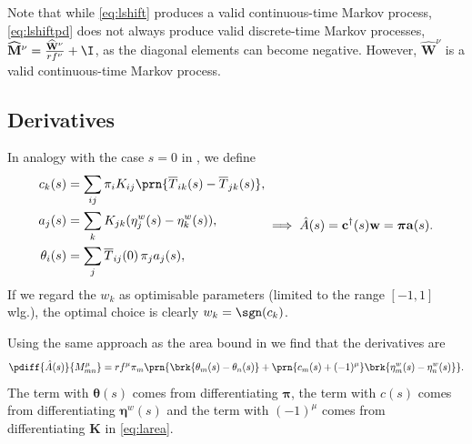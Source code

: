 \documentclass[12pt]{article}
\newcommand{\eqm}{\pi}
\newcommand{\eq}{\boldsymbol{\eqm}}
\newcommand{\fptm}{T}
\newcommand{\fptbm}{\overline{\fptm}}
\newcommand{\etwm}{\eta^w}
\newcommand{\etw}{\boldsymbol{\eta}^w}
\newcommand{\thbm}{\theta}
\newcommand{\thb}{\boldsymbol{\thbm}}
\newcommand{\wm}{w}
\newcommand{\w}{\mathbf{\wm}}
\newcommand{\Wm}{W}
\newcommand{\W}{\mathbf{\Wm}}
\newcommand{\MMdm}{M}
\newcommand{\MMd}{\mathbf{\MMdm}}
\newcommand{\encm}{K}
\newcommand{\enc}{\mathbf{\encm}}
\newcommand{\shift}[1]{\widehat{#1}}
\begin{document}
Note that while \cref{eq:lshift} produces a valid continuous-time Markov process, \cref{eq:lshiftpd} does not always produce valid discrete-time Markov processes, \( \shift{\MMd}^\nu = \frac{\shift{\W}^\nu}{rf^\nu} + \I \), as the diagonal elements can become negative.
However, \(\shift{\W}^\nu \) is a valid continuous-time Markov process.


\subsection{Derivatives}\label{sec:lderiv}

In analogy with the case \(s=0\) in \cite{Lahiri2013synapse}, we define
%
\begin{equation}\label{eq:lareacoeffs}
  \begin{aligned}
    {c}_k(s) &= \sum_{ij} \eqm_i \encm_{ij} \prn{\fptbm_{ik}(s)-\fptbm_{jk}(s)}, \\
    {a}_j(s) &= \sum_{k} \encm_{jk} (\etwm_{j}(s) - \etwm_{k}(s)), \\
    \thbm_i(s) &= \sum_j \fptbm_{ij}(0)\, \eqm_j {a}_j(s), \\
  \end{aligned}
    \implies
    \hat{A}(s) 
      = \mathbf{c}^\dag(s) \w
      = \eq \mathbf{a}(s).
\end{equation}
%
If we regard the \(\wm_k\) as optimisable parameters (limited to the range \( [-1,1] \) wlg.), the optimal choice is clearly \( \wm_k = \sgn(c_k) \).

Using the same approach as the area bound in \cite{Lahiri2013synapse} we find that the derivatives are
%
\begin{equation}\label{eq:lAdiff}
  \pdiff{\hat{A}(s)}{\MMdm^\mu_{mn}}
     = rf^\mu \eqm_m \prn{ \brk{\thbm_m(s) - \thbm_n(s)}
     +\prn{{c}_m(s) + (-1)^\mu} \brk{\etwm_m(s) - \etwm_n(s)} }.
\end{equation}
%
The term with \(\thb(s)\) comes from differentiating \(\eq\), the term with \(c(s)\) comes from differentiating \(\etw(s)\) and the term with \((-1)^\mu\) comes from differentiating \(\enc\) in \eqref{eq:larea}.
\end{document}

